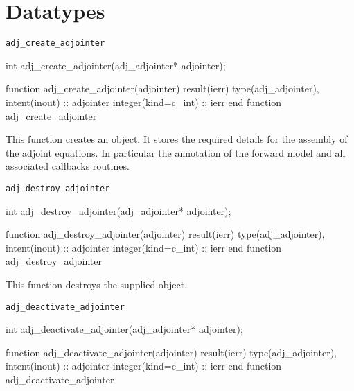 \chapter{Datatypes}
\begin{synopsis}
\end{synopsis}
\minitoc
\vspace{\fill}
\newpage

\begin{boxwithtitle}{\texttt{adj_create_adjointer}}
\begin{minipage}{\columnwidth}
\begin{ccode}
  int adj_create_adjointer(adj_adjointer* adjointer);
\end{ccode}
\begin{fortrancode}
  function adj_create_adjointer(adjointer) result(ierr) 
    type(adj_adjointer), intent(inout) :: adjointer
    integer(kind=c_int) :: ierr
  end function adj_create_adjointer
\end{fortrancode}
\end{minipage}
\end{boxwithtitle}

This function creates an  object. 
It stores the required details for the assembly of the adjoint equations.
In particular the annotation of the forward model and all associated callbacks routines.


\begin{boxwithtitle}{\texttt{adj_destroy_adjointer}}
\begin{minipage}{\columnwidth}
\begin{ccode}
  int adj_destroy_adjointer(adj_adjointer* adjointer);
\end{ccode}
\begin{fortrancode}
  function adj_destroy_adjointer(adjointer) result(ierr) 
    type(adj_adjointer), intent(inout) :: adjointer
    integer(kind=c_int) :: ierr
  end function adj_destroy_adjointer
\end{fortrancode}
\end{minipage}
\end{boxwithtitle}

This function destroys the supplied  object.


\begin{boxwithtitle}{\texttt{adj_deactivate_adjointer}}
\begin{minipage}{\columnwidth}
\begin{ccode}
  int adj_deactivate_adjointer(adj_adjointer* adjointer);
\end{ccode}
\begin{fortrancode}
  function adj_deactivate_adjointer(adjointer) result(ierr) 
    type(adj_adjointer), intent(inout) :: adjointer
    integer(kind=c_int) :: ierr
  end function adj_deactivate_adjointer
\end{fortrancode}
\end{minipage}
\end{boxwithtitle}


